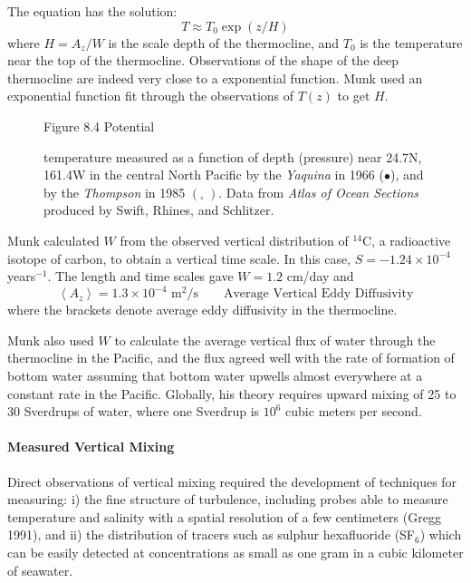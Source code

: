 The equation has the solution:
\begin{equation}
T \approx T_0 \exp (z/H)
\end{equation}
where $H=A_z/W$ is the scale depth of the
thermocline, and $T_0$ is the temperature near the
top of the thermocline. Observations of the shape of the deep
thermocline are indeed very close to a exponential function.  Munk
used an exponential function fit through the observations of $T(z)$ to
get $H$.

\begin{figure}[t!]
\footnotesize
Figure 8.4 Potential \rule{0mm}{3ex}temperature measured as a function
of depth (pressure) near 24.7\degrees N, 161.4\degrees W in the
central North Pacific by the \textit{Yaquina} in 1966 ($\bullet$), and
by the \textit{Thompson} in 1985 $\left( _\square \;\right)$. Data
from \textit{Atlas of Ocean Sections} produced by Swift, Rhines, and
Schlitzer.
\label{fig:mixing}
\vspace{-3ex}
\end{figure}

Munk calculated $W$ from the observed vertical distribution of
$^{14}$C, a radioactive isotope of carbon, to obtain a vertical time
scale. In this case, $S=-1.24 \times 10^{-4}$ years$^{-1}$. The length
and time scales gave $W=1.2$ cm/day and
\begin{equation}
\left< A_z \right> = 1.3 \times 10^{-4} \text{ m$^2$/s} \qquad \text{Average
Vertical Eddy Diffusivity}
\end{equation}
where the brackets denote average eddy diffusivity in the
thermocline.

Munk also used $W$ to calculate the average vertical flux of water
through the thermocline in the Pacific, and the flux agreed well with
the rate of formation of bottom water assuming that bottom water
upwells almost everywhere at a constant rate in the Pacific. Globally,
his theory requires upward mixing of 25 to 30 Sverdrups of water,
where one Sverdrup is $10^6$ cubic meters per second.

\paragraph{Measured Vertical Mixing}
Direct observations of vertical mixing
required the development of techniques for measuring: i) the fine
structure of turbulence, including
probes able to measure temperature and salinity with a spatial
resolution of a few centimeters (Gregg 1991), and ii) the distribution
of tracers such as sulphur hexafluoride (SF$_6$) which can be easily
detected at concentrations as small as one gram in a cubic kilometer
of seawater.

